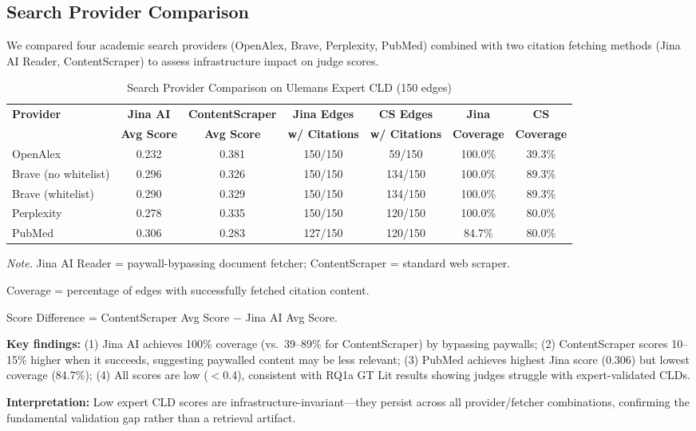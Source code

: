 \documentclass{article}
\begin{document}
\subsection{Search Provider Comparison}

We compared four academic search providers (OpenAlex, Brave, Perplexity, PubMed) combined with two citation fetching methods (Jina AI Reader, ContentScraper) to assess infrastructure impact on judge scores.

\begin{table}[H]
\centering
\caption{Search Provider Comparison on Ulemans Expert CLD (150 edges)}
\label{tab:ulemans_search_providers}
\begin{threeparttable}
\begin{tabular}{lcccccc}
\toprule
\textbf{Provider} & \textbf{Jina AI} & \textbf{ContentScraper} & \textbf{Jina Edges} & \textbf{CS Edges} & \textbf{Jina} & \textbf{CS} \\
 & \textbf{Avg Score} & \textbf{Avg Score} & \textbf{w/ Citations} & \textbf{w/ Citations} & \textbf{Coverage} & \textbf{Coverage} \\
\midrule
OpenAlex & 0.232 & 0.381 & 150/150 & 59/150 & 100.0\% & 39.3\% \\
Brave (no whitelist) & 0.296 & 0.326 & 150/150 & 134/150 & 100.0\% & 89.3\% \\
Brave (whitelist) & 0.290 & 0.329 & 150/150 & 134/150 & 100.0\% & 89.3\% \\
Perplexity & 0.278 & 0.335 & 150/150 & 120/150 & 100.0\% & 80.0\% \\
PubMed & 0.306 & 0.283 & 127/150 & 120/150 & 84.7\% & 80.0\% \\
\bottomrule
\end{tabular}
\begin{tablenotes}
\small
\item \textit{Note.} Jina AI Reader = paywall-bypassing document fetcher; ContentScraper = standard web scraper.
\item Coverage = percentage of edges with successfully fetched citation content.
\item Score Difference = ContentScraper Avg Score $-$ Jina AI Avg Score.
\item \textbf{Key findings:} (1) Jina AI achieves 100\% coverage (vs.\ 39--89\% for ContentScraper) by bypassing paywalls; (2) ContentScraper scores 10--15\% higher when it succeeds, suggesting paywalled content may be less relevant; (3) PubMed achieves highest Jina score (0.306) but lowest coverage (84.7\%); (4) All scores are low ($<$0.4), consistent with RQ1a GT Lit results showing judges struggle with expert-validated CLDs.
\item \textbf{Interpretation:} Low expert CLD scores are infrastructure-invariant---they persist across all provider/fetcher combinations, confirming the fundamental validation gap rather than a retrieval artifact.
\end{tablenotes}
\end{threeparttable}
\end{table}
\end{document}
